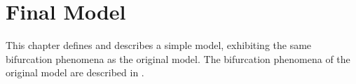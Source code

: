 \chapter{Final Model}

This chapter defines and describes a simple model, exhibiting the same bifurcation phenomena as the original model.
The bifurcation phenomena of the original model are described in .





